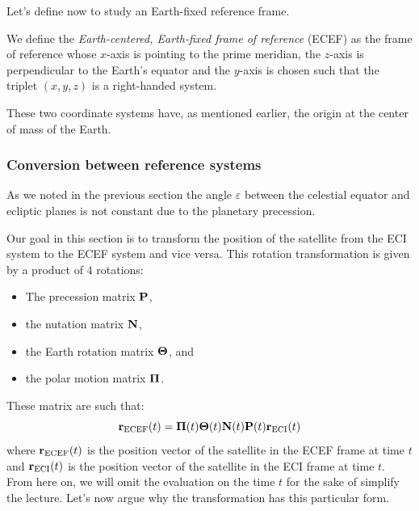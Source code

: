 \documentclass[../main.tex]{subfiles}
\begin{document}
Let's define now to study an Earth-fixed reference frame.
\begin{definition}
  We define the \emph{Earth-centered, Earth-fixed frame of reference} (ECEF) as the frame of reference whose $x$-axis is pointing to the prime meridian, the $z$-axis is perpendicular to the Earth's equator and the $y$-axis is chosen such that the triplet $(x,y,z)$ is a right-handed system.
\end{definition}
These two coordinate systems have, as mentioned earlier, the origin at the center of mass of the Earth.
\subsubsection{Conversion between reference systems}

As we noted in the previous section the angle $\varepsilon$ between the celestial equator and ecliptic planes is not constant due to the planetary precession.

Our goal in this section is to transform the position of the satellite from the ECI system to the ECEF system and vice versa. This rotation transformation is given by a product of 4 rotations:
\begin{itemize}
  \item The precession matrix $\boldsymbol{\mathrm{P}}$,
  \item the nutation matrix $\boldsymbol{\mathrm{N}}$,
  \item the Earth rotation matrix $\boldsymbol{\mathrm{\Theta}}$, and
  \item the polar motion matrix $\boldsymbol{\mathrm{\Pi}}$.
\end{itemize}
These matrix are such that:
\begin{equation}
  \boldsymbol{\mathrm{r}}_\mathrm{ECEF}(t)=\boldsymbol{\mathrm{\Pi}}(t)\boldsymbol{\mathrm{\Theta}}(t)\boldsymbol{\mathrm{N}}(t)\boldsymbol{\mathrm{P}}(t)\boldsymbol{\mathrm{r}}_\mathrm{ECI}(t)
\end{equation}
where $\boldsymbol{\mathrm{r}}_\mathrm{ECEF}(t)$ is the position vector of the satellite in the ECEF frame at time $t$ and $\boldsymbol{\mathrm{r}}_\mathrm{ECI}(t)$ is the position vector of the satellite in the ECI frame at time $t$. From here on, we will omit the evaluation on the time $t$ for the sake of simplify the lecture. Let's now argue why the transformation has this particular form.
\end{document}
